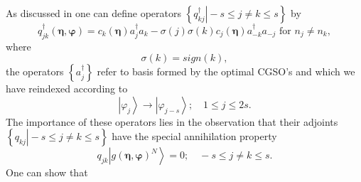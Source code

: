 \documentclass[aps,preprint]{revtex4}%
\begin{document}
As discussed in \cite{weiner2004}\cite{Kurtz}\cite{Goscinski} one can define
operators $\left\{  \left.  q_{kj}^{\dagger}\right\vert -s\leq j\neq k\leq
s\right\}  $ by
\begin{equation}
q_{jk}^{\dagger}\left(  \mathbf{\eta,\varphi}\right)  =c_{k}\left(
\mathbf{\eta}\right)  a_{j}^{\dagger}a_{k}-\sigma\left(  j\right)
\sigma\left(  k\right)  c_{j}\left(  \mathbf{\eta}\right)  a_{-k}^{\dagger
}a_{-j}\text{ for }n_{j}\neq n_{k},
\end{equation}
where
\begin{equation}
\sigma\left(  k\right)  =sign\left(  k\right)  ,
\end{equation}
the operators $\left\{  a_{j}^{\dagger}\right\}  $ refer to basis formed by
the optimal CGSO's and which we have reindexed according to
\begin{equation}
\left\vert \varphi_{j}\right\rangle \rightarrow\left\vert \varphi
_{j-s}\right\rangle ;\quad1\leq j\leq2s.
\end{equation}
The importance of these operators lies in the observation that their adjoints
$\left\{  \left.  q_{kj}\right\vert -s\leq j\neq k\leq s\right\}  $ have the
special annihilation property%
\begin{equation}
q_{jk}\left\vert g\left(  \mathbf{\eta},\mathbf{\varphi}\right)
^{N}\right\rangle =0;\quad-s\leq j\neq k\leq s.
\end{equation}
One can show \cite{Weiner&Goscinski83} that
\end{document}
